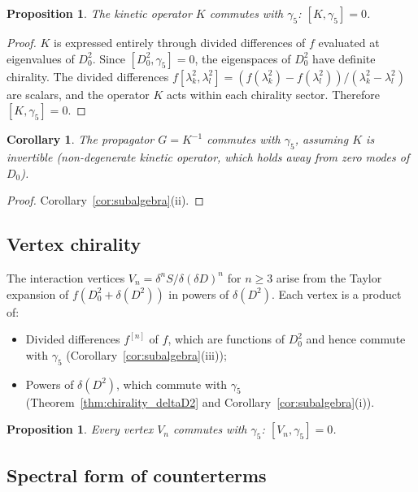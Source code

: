 \documentclass[12pt,a4paper]{article}
\newtheorem{corollary}[theorem]{Corollary}
\newtheorem{proposition}[theorem]{Proposition}
\theoremstyle{definition}
\theoremstyle{remark}
\begin{document}
\begin{proposition}\label{prop:kinetic_chiral}
The kinetic operator $K$ commutes with $\gamma_5$: $[K, \gamma_5] = 0$.
\end{proposition}

\begin{proof}
$K$ is expressed entirely through divided differences of $f$ evaluated at
eigenvalues of $D_0^2$.  Since $[D_0^2, \gamma_5] = 0$, the eigenspaces of
$D_0^2$ have definite chirality.  The divided differences
$f[\lambda_k^2, \lambda_l^2] = (f(\lambda_k^2) - f(\lambda_l^2))/(\lambda_k^2 - \lambda_l^2)$
are scalars, and the operator $K$ acts within each chirality sector.
Therefore $[K, \gamma_5] = 0$.
\end{proof}

\begin{corollary}\label{cor:propagator_chiral}
The propagator $G = K^{-1}$ commutes with $\gamma_5$, assuming $K$ is
invertible (non-degenerate kinetic operator, which holds away from zero modes
of~$D_0$).
\end{corollary}

\begin{proof}
Corollary~\ref{cor:subalgebra}(ii).
\end{proof}

\subsection{Vertex chirality}

The interaction vertices $V_n = \delta^n S / \delta(\delta D)^n$ for
$n \geq 3$ arise from the Taylor expansion of $f(D_0^2 + \delta(D^2))$ in
powers of $\delta(D^2)$.  Each vertex is a product of:
\begin{itemize}
  \item Divided differences $f^{[n]}$ of $f$, which are functions of $D_0^2$
        and hence commute with $\gamma_5$ (Corollary~\ref{cor:subalgebra}(iii));
  \item Powers of $\delta(D^2)$, which commute with $\gamma_5$
        (Theorem~\ref{thm:chirality_deltaD2} and
        Corollary~\ref{cor:subalgebra}(i)).
\end{itemize}

\begin{proposition}\label{prop:vertex_chiral}
Every vertex $V_n$ commutes with $\gamma_5$: $[V_n, \gamma_5] = 0$.
\end{proposition}

\subsection{Spectral form of counterterms}
\end{document}
